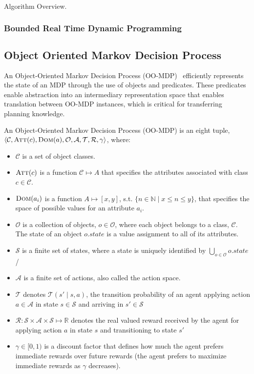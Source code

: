 \documentclass[11pt]{article}
\begin{document}
Algorithm Overview.

\subsubsection{Bounded Real Time Dynamic Programming}



\subsection{Object Oriented Markov Decision Process}


An Object-Oriented Markov Decision Process (OO-MDP)~\cite{diuk08} efficiently represents the state
of an MDP through the use of objects and predicates. These predicates enable abstraction into an intermediary representation space that enables translation between OO-MDP instances, which is critical for transferring planning knowledge. \\

{ An \textup{Object-Oriented Markov Decision Process (OO-MDP)} is an eight tuple, $\langle \mathcal{C}, \textsc{Att}(c), \textsc{Dom}(a), \mathcal{O},
\mathcal{A}, \mathcal{T}, \mathcal{R}, \gamma \rangle$, where:

\begin{itemize}
\item $\mathcal{C}$ is a set of object classes.
\item $\textsc{Att}(c)$ is a function $\mathcal{C} \mapsto A$ that specifies the attributes associated with class $c \in \mathcal{C}$.
\item $\textsc{Dom}(a_i)$ is a function $A \mapsto [x,y]$, s.t. $\{n \in \mathbb{N} \mid x \leq n \leq y \}$, that specifies the space of possible values for an attribute $a_i$.
\item $\mathcal{O}$ is a collection of objects, $o \in \mathcal{O}$, where each object belongs to a class, $\mathcal{C}$. The \textup{state} of an object $o.state$ is a value assignment to all of its attributes.
\item $\mathcal{S}$ is a finite set of states, where a state is uniquely identified by $\bigcup_{o \in \mathcal{O}} o.state$/
\item $\mathcal{A}$ is a finite set of actions, also called the \textup{action space}.
\item $\mathcal{T}$ denotes $\mathcal{T}(s' \mid s,a)$, the
transition probability of an agent applying action $a \in \mathcal{A}$
in state $s \in \mathcal{S}$ and arriving in $s' \in \mathcal{S}$
\item $\mathcal{R} : \mathcal{S} \times \mathcal{A} \times \mathcal{S} \mapsto \mathbb{R}$ denotes the real valued reward received by the agent for
applying action $a$ in state $s$ and transitioning to state $s'$
\item $\gamma \in [0, 1)$ is a discount factor that defines how much the
  agent prefers immediate rewards over future rewards (the agent
  prefers to maximize immediate rewards as $\gamma$ decreases).
\end{itemize}}
\end{document}
